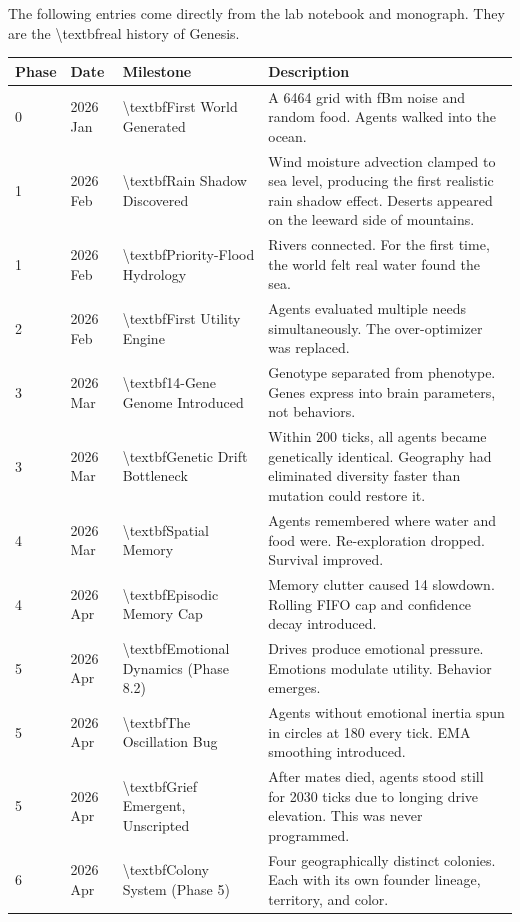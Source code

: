 \documentclass[11pt,a4paper]{article}
\begin{document}
The following entries come directly from the lab notebook and monograph. They are the \textbackslash{}textbf{real history of Genesis}.

\begin{longtable}{llll}
\toprule
Phase & Date & Milestone & Description \\
\midrule
\endhead
0 & 2026 Jan & \textbackslash{}textbf{First World Generated} & A 6464 grid with fBm noise and random food. Agents walked into the ocean. \\
1 & 2026 Feb & \textbackslash{}textbf{Rain Shadow Discovered} & Wind moisture advection clamped to sea level, producing the first realistic rain shadow effect. Deserts appeared on the leeward side of mountains. \\
1 & 2026 Feb & \textbackslash{}textbf{Priority-Flood Hydrology} & Rivers connected. For the first time, the world felt real  water found the sea. \\
2 & 2026 Feb & \textbackslash{}textbf{First Utility Engine} & Agents evaluated multiple needs simultaneously. The over-optimizer was replaced. \\
3 & 2026 Mar & \textbackslash{}textbf{14-Gene Genome Introduced} & Genotype separated from phenotype. Genes express into brain parameters, not behaviors. \\
3 & 2026 Mar & \textbackslash{}textbf{Genetic Drift Bottleneck} & Within 200 ticks, all agents became genetically identical. Geography had eliminated diversity faster than mutation could restore it. \\
4 & 2026 Mar & \textbackslash{}textbf{Spatial Memory} & Agents remembered where water and food were. Re-exploration dropped. Survival improved. \\
4 & 2026 Apr & \textbackslash{}textbf{Episodic Memory Cap} & Memory clutter caused 14 slowdown. Rolling FIFO cap and confidence decay introduced. \\
5 & 2026 Apr & \textbackslash{}textbf{Emotional Dynamics (Phase 8.2)} & Drives produce emotional pressure. Emotions modulate utility. Behavior emerges. \\
5 & 2026 Apr & \textbackslash{}textbf{The Oscillation Bug} & Agents without emotional inertia spun in circles at 180 every tick. EMA smoothing introduced. \\
5 & 2026 Apr & \textbackslash{}textbf{Grief  Emergent, Unscripted} & After mates died, agents stood still for 2030 ticks due to longing drive elevation. This was never programmed. \\
6 & 2026 Apr & \textbackslash{}textbf{Colony System (Phase 5)} & Four geographically distinct colonies. Each with its own founder lineage, territory, and color. \\

\end{longtable}
\end{document}
